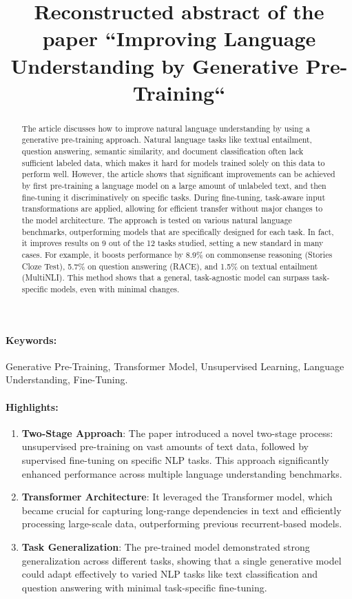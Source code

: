 \documentclass[12pt]{article}
\title{Reconstructed abstract of the paper ``Improving Language Understanding by Generative Pre-Training``}
\date{}
\begin{document}
\maketitle

\begin{abstract}
    The article discusses how to improve natural language understanding by using a generative pre-training approach.
    Natural language tasks like textual entailment, question answering, semantic similarity, and document classification often lack sufficient labeled data, 
    which makes it hard for models trained solely on this data to perform well. However, the article shows that significant improvements can be achieved by 
    first pre-training a language model on a large amount of unlabeled text, and then fine-tuning it discriminatively on specific tasks. During fine-tuning,
    task-aware input transformations are applied, allowing for efficient transfer without major changes to the model architecture.
    The approach is tested on various natural language benchmarks, outperforming models that are specifically designed for each task.
    In fact, it improves results on 9 out of the 12 tasks studied, setting a new standard in many cases. For example, it boosts performance by 8.9\% on commonsense 
    reasoning (Stories Cloze Test), 5.7\% on question answering (RACE), and 1.5\% on textual entailment (MultiNLI). This method shows that a general, task-agnostic 
    model can surpass task-specific models, even with minimal changes.
\end{abstract}
\paragraph{Keywords:} Generative Pre-Training, Transformer Model, Unsupervised Learning, Language Understanding, Fine-Tuning.

\paragraph{Highlights:}
\begin{enumerate}
\item \textbf{Two-Stage Approach}: The paper introduced a novel two-stage process: unsupervised pre-training on vast amounts of text data, followed by supervised fine-tuning on specific NLP tasks. This approach significantly enhanced performance across multiple language understanding benchmarks.
\item \textbf{Transformer Architecture}: It leveraged the Transformer model, which became crucial for capturing long-range dependencies in text and efficiently processing large-scale data, outperforming previous recurrent-based models.
\item \textbf{Task Generalization}: The pre-trained model demonstrated strong generalization across different tasks, showing that a single generative model could adapt effectively to varied NLP tasks like text classification and question answering with minimal task-specific fine-tuning.
\end{enumerate}
\end{document}
